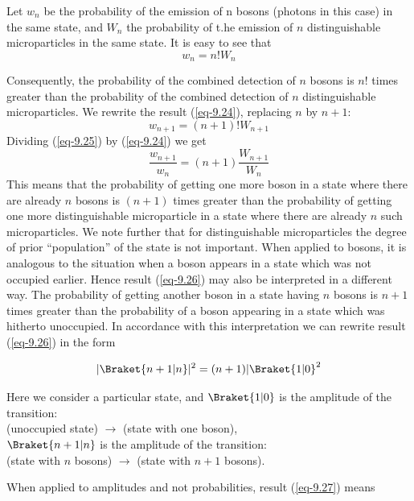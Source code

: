 \documentclass[a4paper,sfsidenotes,colorlinks=true]{tufte-book}
\numberwithin{equation}{section}
\numberwithin{figure}{section}
\begin{document}
Let $w_{n}$ be the probability of the emission of n bosons (photons in this case) in the same state, and $W_{n}$ the probability of t.he emission of $n$ distinguishable microparticles in the same state. It is easy to see that
\begin{equation}%
w_{n} = n! W_{n}	
\label{eq-9.24}
\end{equation}

Consequently, the probability of the combined detection of $n$ bosons is $n!$ times greater than the probability of the combined detection of $n$ distinguishable microparticles. We rewrite the result (\ref{eq-9.24}), replacing $n$ by $n + 1$:
\begin{equation}%
w_{n+1} = (n+1)! W_{n+1}	
\label{eq-9.25}
\end{equation}
Dividing (\ref{eq-9.25}) by (\ref{eq-9.24}) we get
\begin{equation}%
\frac{w_{n+1}}{w_{n}} = (n+1) \frac{W_{n+1}}{W_{n}} 
\label{eq-9.26}
\end{equation}
This means that the probability of getting one more boson in a state
where there are already $n$ bosons is $(n + 1)$ times greater than the
probability of getting one more distinguishable microparticle in a
state where there are already $n$ such microparticles. We note further
that for distinguishable microparticles the degree of prior ``population'' of the state is not important. When applied to bosons, it is analogous to the situation when a boson appears in a state which was not occupied earlier. Hence result (\ref{eq-9.26}) may also be interpreted in a different way. The probability of getting another boson in a state having $n$ bosons is $n + 1$ times greater than the probability of a boson appearing in a state which was hitherto unoccupied. In accordance with this interpretation we can rewrite result
(\ref{eq-9.26}) in the form

\begin{equation}%
| \Braket{n + 1 | n} |^{2} = (n + 1) | \Braket{1 | 0}^{2}	
\label{eq-9.27}
\end{equation}

Here we consider a particular state, and $\Braket{1 | 0}$ is the
amplitude of the transition:\\
(unoccupied state) $\to$ (state with one boson), \\
$\Braket{n + 1| n}$ is the amplitude of the transition:\\
(state with $n$ bosons) $\to$ (state with $n + 1$ bosons).
 
When applied to amplitudes and not probabilities, result (\ref{eq-9.27})
means
\end{document}

